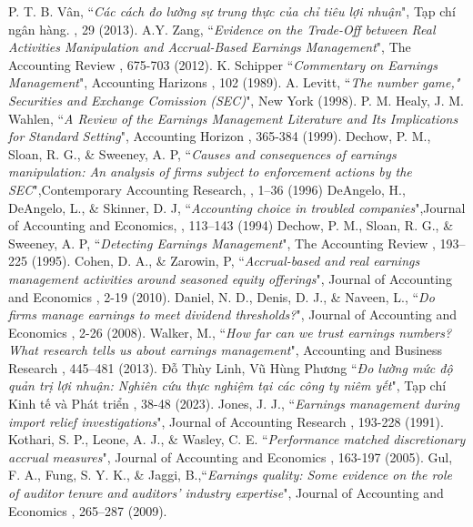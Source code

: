 \documentclass[a4paper]{article}
\begin{document}
\newpage
\begin{thebibliography}{99}
 P. T. B. Vân, ``\emph{Các cách đo lường sự trung thực của chỉ tiêu lợi nhuận}", Tạp chí ngân hàng. , 29 (2013).
 A.Y. Zang, ``\emph{Evidence on the Trade-Off between Real Activities Manipulation and Accrual-Based Earnings Management}", The Accounting Review , 675-703 (2012).
 K. Schipper ``\emph{Commentary on Earnings Management}", Accounting Harizons , 102 (1989).
 A. Levitt, ``\emph{The number game," Securities and Exchange Comission (SEC)}", New York (1998).
 P. M. Healy, J. M. Wahlen, ``\emph{A Review of the Earnings Management Literature and Its Implications for Standard Setting}", Accounting Horizon , 365-384 (1999).
 Dechow, P. M., Sloan, R. G., \& Sweeney, A. P, ``\emph{Causes and consequences of earnings manipulation: An analysis of firms subject to enforcement actions by the SEC}",Contemporary Accounting Research, , 1–36 (1996)
 DeAngelo, H., DeAngelo, L., \& Skinner, D. J, ``\emph{Accounting choice in troubled companies}",Journal of Accounting and Economics, , 113–143 (1994)
 Dechow, P. M., Sloan, R. G., \& Sweeney, A. P, ``\emph{Detecting Earnings Management}", The Accounting Review , 193–225 (1995).
 Cohen, D. A., \& Zarowin, P, ``\emph{Accrual-based and real earnings management activities around seasoned equity offerings}", Journal of Accounting and Economics , 2-19 (2010).
 Daniel, N. D., Denis, D. J., \& Naveen, L., ``\emph{Do firms manage earnings to meet dividend thresholds?}", Journal of Accounting and Economics , 2-26 (2008).
 Walker, M., ``\emph{How far can we trust earnings numbers? What research tells us about earnings management}", Accounting and Business Research , 445–481 (2013).
 Đỗ Thùy Linh, Vũ Hùng Phương ``\emph{Đo lường mức độ quản trị lợi nhuận: Nghiên cứu thực nghiệm tại các công ty niêm yết}", Tạp chí Kinh tế và Phát triển , 38-48 (2023).
 Jones, J. J., ``\emph{Earnings  management  during  import  relief  investigations}", Journal of Accounting Research , 193-228 (1991).
 Kothari, S. P.,  Leone, A. J., \& Wasley, C. E. ``\emph{Performance matched discretionary accrual measures}", Journal of Accounting and Economics , 163-197 (2005).
 Gul, F. A., Fung, S. Y. K., \& Jaggi, B.,``\emph{Earnings quality: Some evidence on the role of auditor tenure and auditors’ industry expertise}", Journal of Accounting and Economics , 265–287 (2009).

\end{thebibliography}
\end{document}
